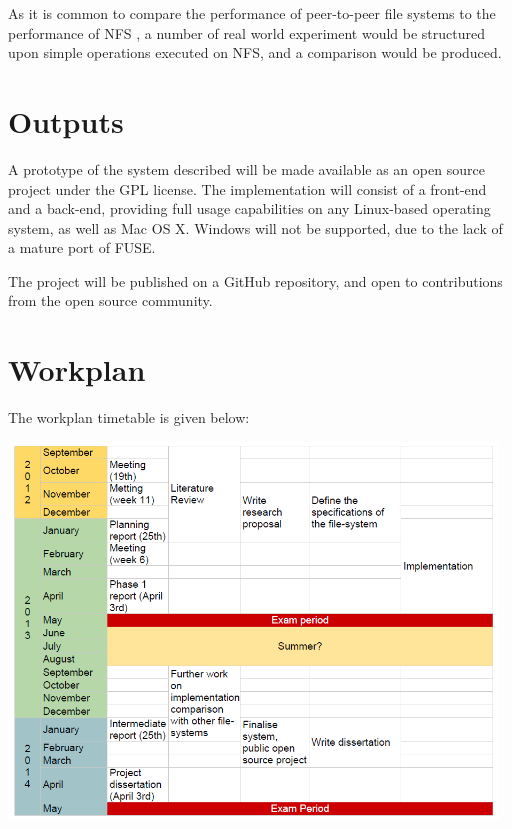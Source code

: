\documentclass[8pt,a4paper]{article}
\begin{document}
As it is common to compare the performance of peer-to-peer file systems to the performance of NFS \cite{pastis} \cite{ivy} \cite{oceanstore}, a number of real world experiment would be structured upon simple operations executed on NFS, and a comparison would be produced.

\section{Outputs}

A prototype of the system described will be made available as an open source project under the GPL \cite{gpl} license. The implementation will consist of a front-end and a back-end, providing full usage capabilities on any Linux-based operating system, as well as Mac OS X. Windows will not be supported, due to the lack of a mature port of FUSE. 

The project will be published on a GitHub \cite{github} repository, and open to contributions from the open source community.

\section{Workplan}

The workplan timetable is given below:

\begin{center}
\includegraphics[width=13cm]{timetable.png}
\end{center}
\end{document}
